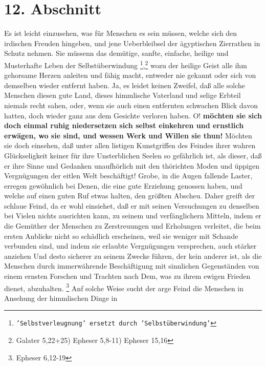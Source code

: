 {\section{12. Abschnitt} \label{kap17_ab12}

Es ist leicht einzusehen, was für Menschen es sein müssen, welche sich den
irdischen Freuden hingeben, und jene Ueberbleibsel der ägyptischen Zierrathen in
Schutz nehmen. Sie müssenn das demütige, sanfte, einfache, heilige und
Musterhafte Leben der Selbstüberwindung
\footnote{\texttt{'Selbstverleugnung' ersetzt durch
'Selbstüberwindung'}},\footnote{Galater 5,22+25) Epheser 5,8-11)
Epheser 15,16}
wozu der heilige Geist alle ihm gehorsame Herzen anleiten und fähig
macht, entweder nie gekannt oder sich von demselben wieder entfernt haben. Ja,
es leidet keinen Zweifel, daß alle solche Menschen diesen gute Land, dieses
himmlische Vaterland und selige Erbteil niemals recht sahen, oder, wenn sie auch
einen entfernten schwachen Blick davon hatten, doch wieder ganz aus dem Gesichte
verloren haben. O! \label{ref:17_12_einkehr}\textbf{möchten sie sich doch einmal ruhig niedersetzen sich
selbst
einkehren und ernstlich erwägen, wo sie sind, und wessen Werk und Willen sie
thun!} Möchten sie doch einsehen, daß unter allen listigen Kunstgriffen des
Feindes ihrer wahren Glückseligkeit keiner für ihre Unsterblichen Seelen so
gefährlich ist, als dieser, daß er ihre Sinne und Gedanken unaufhörlich mit den
thörichten Moden und üppigen Vergnügungen der eitlen Welt beschäftigt! Grobe, in
die Augen fallende Laster, erregen gewöhnlich bei Denen, die eine gute Erziehung
genossen haben, und welche auf einen guten Ruf etwas halten, den größten
Abscheu. Daher greift der schlaue Feind, da er wohl einsiehet, daß er mit seinen
Versuchungen zu denselben bei Vielen nichts ausrichten kann, zu seinem und
verfänglichern Mitteln, indem er die Gemüther der Menschen zu Zerstreuungen und
Erholungen verleitet, die beim ersten Anblicke nicht so schädlich erscheinen,
weil sie weniger mit Schande verbunden sind, und indem sie erlaubte Vergnügungen
versprechen, auch stärker anziehen Und desto sicherer zu seinem Zwecke führen,
der kein anderer ist, als die Menschen durch immerwährende Beschäftigung mit
sinnlichen Gegenständen von einem ernsten Forschen und Trachten nach Dem, was zu
ihrem ewigen Frieden dienet, abzuhalten.
\footnote{Epheser 6,12-19}
Anf solche
Weise sucht der arge Feind die Menschen in Ansehung der himmlischen Dinge in
}
